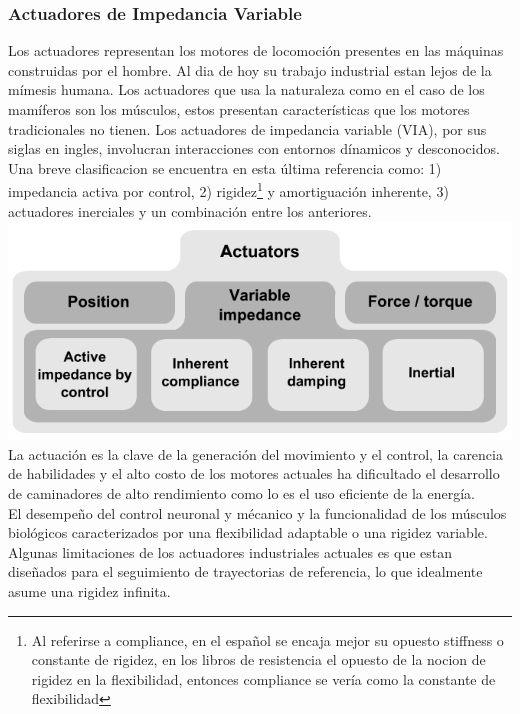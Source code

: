 \documentclass[10pt,onecolumn,twoside,letterpaper]{article}
\begin{document}
\subsubsection{Actuadores de Impedancia Variable}
Los actuadores representan los motores de locomoci\'on presentes en las m\'aquinas construidas por el hombre. Al dia de hoy su trabajo industrial estan lejos de la m\'imesis humana. Los actuadores que usa la naturaleza como en el caso de los mam\'iferos son los m\'usculos, estos presentan caracter\'isticas que los motores tradicionales no tienen. Los actuadores de impedancia variable (VIA), por sus siglas en ingles, involucran interacciones con entornos d\'inamicos y desconocidos\cite{Vanderborght2013}. Una breve clasificacion se encuentra en esta \'ultima referencia como: 1) impedancia activa por control, 2) rigidez\footnote{Al referirse a compliance, en el espa\~nol se encaja mejor su opuesto stiffness o constante de rigidez, en los libros de resistencia el opuesto de la nocion de rigidez en la flexibilidad, entonces compliance se ver\'ia como la constante de flexibilidad} y amortiguaci\'on inherente, 3) actuadores inerciales y un combinaci\'on entre los anteriores.\\
\includegraphics[scale=0.4]{../../images/GeneralClassificationVIAs.png}\cite{Vanderborght2013}\\
La actuaci\'on es la clave de la generaci\'on del movimiento y el control, la carencia de habilidades y el alto costo de los motores actuales ha dificultado el desarrollo de caminadores de alto rendimiento como lo es el uso eficiente de la energ\'ia.\cite{Vanderborght2013}\\
El desempe\~no del control neuronal y m\'ecanico y la funcionalidad de los m\'usculos biol\'ogicos caracterizados por una flexibilidad adaptable o una rigidez variable.\cite{Vanderborght2013,Albu-Schaeffer2009}\\
Algunas limitaciones de los actuadores industriales actuales es que estan dise\~nados para el seguimiento de trayectorias de referencia, lo que idealmente asume una rigidez infinita.\cite{Vanderborght2013}
\end{document}
